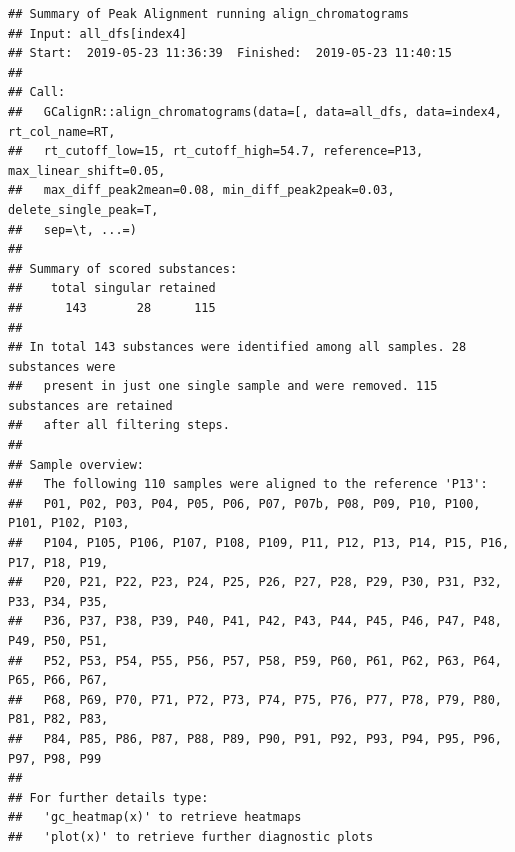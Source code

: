 \documentclass[]{article}
\newenvironment{Shaded}{\begin{snugshade}}{\end{snugshade}}
\newcommand{\KeywordTok}[1]{\textcolor[rgb]{0.13,0.29,0.53}{\textbf{#1}}}
\newcommand{\DecValTok}[1]{\textcolor[rgb]{0.00,0.00,0.81}{#1}}
\newcommand{\CharTok}[1]{\textcolor[rgb]{0.31,0.60,0.02}{#1}}
\newcommand{\StringTok}[1]{\textcolor[rgb]{0.31,0.60,0.02}{#1}}
\newcommand{\OtherTok}[1]{\textcolor[rgb]{0.56,0.35,0.01}{#1}}
\newcommand{\ControlFlowTok}[1]{\textcolor[rgb]{0.13,0.29,0.53}{\textbf{#1}}}
\newcommand{\OperatorTok}[1]{\textcolor[rgb]{0.81,0.36,0.00}{\textbf{#1}}}
\newcommand{\NormalTok}[1]{#1}
\begin{document}
\begin{verbatim}
## Summary of Peak Alignment running align_chromatograms
## Input: all_dfs[index4]
## Start:  2019-05-23 11:36:39  Finished:  2019-05-23 11:40:15 
## 
## Call:
##   GCalignR::align_chromatograms(data=[, data=all_dfs, data=index4, rt_col_name=RT,
##   rt_cutoff_low=15, rt_cutoff_high=54.7, reference=P13, max_linear_shift=0.05,
##   max_diff_peak2mean=0.08, min_diff_peak2peak=0.03, delete_single_peak=T,
##   sep=\t, ...=)
## 
## Summary of scored substances:
##    total singular retained 
##      143       28      115 
## 
## In total 143 substances were identified among all samples. 28 substances were
##   present in just one single sample and were removed. 115 substances are retained
##   after all filtering steps.
## 
## Sample overview:
##   The following 110 samples were aligned to the reference 'P13':
##   P01, P02, P03, P04, P05, P06, P07, P07b, P08, P09, P10, P100, P101, P102, P103,
##   P104, P105, P106, P107, P108, P109, P11, P12, P13, P14, P15, P16, P17, P18, P19,
##   P20, P21, P22, P23, P24, P25, P26, P27, P28, P29, P30, P31, P32, P33, P34, P35,
##   P36, P37, P38, P39, P40, P41, P42, P43, P44, P45, P46, P47, P48, P49, P50, P51,
##   P52, P53, P54, P55, P56, P57, P58, P59, P60, P61, P62, P63, P64, P65, P66, P67,
##   P68, P69, P70, P71, P72, P73, P74, P75, P76, P77, P78, P79, P80, P81, P82, P83,
##   P84, P85, P86, P87, P88, P89, P90, P91, P92, P93, P94, P95, P96, P97, P98, P99
## 
## For further details type:
##   'gc_heatmap(x)' to retrieve heatmaps
##   'plot(x)' to retrieve further diagnostic plots
\end{verbatim}

\begin{Shaded}
\end{Shaded}
\end{document}
